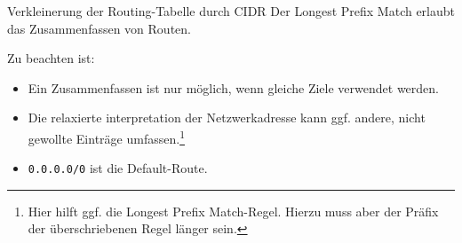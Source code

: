 \begin{bonus}{Verkleinerung der Routing-Tabelle durch CIDR}
    Der Longest Prefix Match erlaubt das Zusammenfassen von Routen.

    Zu beachten ist:
    \begin{itemize}
        \item Ein Zusammenfassen ist nur möglich, wenn gleiche Ziele verwendet werden.
        \item Die relaxierte interpretation der Netzwerkadresse kann ggf. andere, nicht gewollte Einträge umfassen.\footnote{Hier hilft ggf. die Longest Prefix Match-Regel. Hierzu muss aber der Präfix der überschriebenen Regel länger sein.}
        \item \texttt{0.0.0.0/0} ist die Default-Route.
    \end{itemize}
\end{bonus}